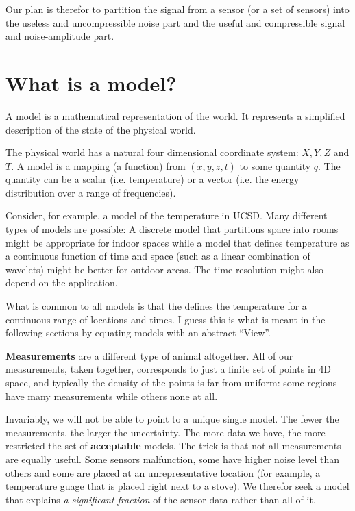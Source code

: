 \documentclass[11pt]{article}
\begin{document}
Our plan is therefor to partition the signal from a sensor (or a set
of sensors) into the useless and uncompressible noise part and the
useful and compressible signal and noise-amplitude part.

\section{What is a model?}

A model is a mathematical representation of the world. It represents
a simplified description of the state of the physical world. 

The physical world has a natural four dimensional coordinate system:
$X,Y,Z$ and $T$. A model is a mapping (a function) from $(x,y,z,t)$ to
some quantity $q$. The quantity can be a scalar (i.e. temperature) or a
vector (i.e. the energy distribution over a range of frequencies).

Consider, for example, a model of the temperature in UCSD. Many
different types of models are possible: A discrete model that
partitions space into rooms might be appropriate for indoor spaces
while a model that defines temperature as a continuous function of
time and space (such as a linear combination of wavelets) might be
better for outdoor areas. The time resolution might also depend on the
application. 

What is common to all models is that the defines the temperature for
a continuous range of locations and times. I guess this is what is
meant in the following sections by equating models with an abstract
``View''.

{\bf Measurements} are a different type of animal altogether. All of
our measurements, taken together, corresponds to just a finite set of
points in 4D space, and typically the density of the points is far
from uniform: some regions have many measurements while others
none at all.

Invariably, we will not be able to point to a unique single model.
The fewer the measurements, the larger the uncertainty. The more
data we have, the more restricted the set of {\bf acceptable} models.
The trick is that not all measurements are equally useful. Some
sensors malfunction, some have higher noise level than others and some
are placed at an unrepresentative location (for example, a temperature
guage that is placed right next to a stove). We therefor seek a model
that explains {\em a significant fraction} of the sensor data rather
than all of it.
\end{document}
